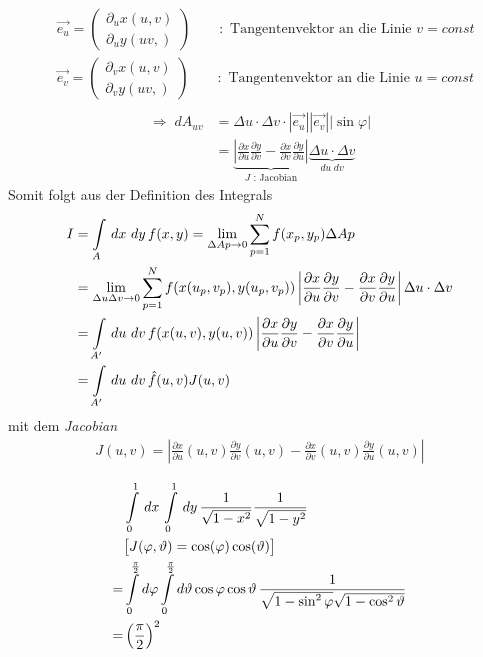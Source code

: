 \begin{align*}
&\vec{e_u} = \begin{pmatrix}\partial_u x(u,v)\\\partial_uy(uv,)\end{pmatrix} \qquad : \text{ Tangentenvektor an die Linie } v=const\\
&\vec{e_v} = \begin{pmatrix}\partial_v x(u,v)\\\partial_vy(uv,)\end{pmatrix} \qquad : \text{ Tangentenvektor an die Linie } u=const\\
\end{align*}
\begin{align*}
\Rightarrow\; dA_{uv} &= \Delta u \cdot \Delta v \cdot
|\vec{e_u}||\vec{e_v}||\sin{\varphi}|\\ 
&= \underbrace{\left|\frac{\partial x}{\partial u}\frac{\partial y}{\partial v}
- \frac{\partial x}{\partial v}\frac{\partial y}{\partial u}\right|}_{J
\text{ : Jacobian}}
\underbrace{\Delta u \cdot \Delta v}_{du\;dv}
\end{align*}
Somit folgt aus der Definition des Integrals
\begin{align}
I &= \int \limits_{A} \,dx\, \,dy\, f(x,y) = \lim \limits_{\Delta Ap\to 0} \sum \limits_{p=1}^{N} f(x_p,y_p)\Delta Ap\\ \nonumber
&= \lim \limits_{\Delta u\Delta v\to 0} \sum \limits_{p=1}^{N} f(x(u_p,v_p),
y(u_p,v_p))\left|\frac{\partial x}{\partial u}\frac{\partial
y}{\partial v}-\frac{\partial x}{\partial v}\frac{\partial y}{\partial
u}\right|\Delta u \cdot \Delta v\\ \nonumber &= \int \limits_{A'}\,du\, \,dv\,
f(x(u,v),y(u,v))\left|\frac{\partial x}{\partial u}\frac{\partial
y}{\partial v}-\frac{\partial x}{\partial v}\frac{\partial y}{\partial
u}\right|\\ \nonumber &=\int \limits_{A'} \,du\,\,dv\, \hat{f}(u,v)J(u,v)
\end{align}
mit dem {\em Jacobian}
\begin{align}
J(u,v) = \left|\frac{\partial x}{\partial u}(u,v)\frac{\partial y}{\partial
v}(u,v) - \frac{\partial x}{\partial v}(u,v)\frac{\partial y}{\partial
u}(u,v)\right|
\end{align}

\begin{Beispiel}
\begin{align*}
&\int\limits_{0}^{1}\,dx\,\int\limits_{0}^{1}\,dy\, \frac{1}{\sqrt{1-x^2}}\frac{1}{\sqrt{1-y^2}}\\
&\big[ J(\varphi,\vartheta) = \cos(\varphi)\cos(\vartheta) \big]\\
= & \int\limits_{0}^{\frac{\pi}{2}} d\varphi \int\limits_{0}^{\frac{\pi}{2}}
d\vartheta \cos{\varphi}\cos{\vartheta}\,
\frac{1}{\sqrt{1-\sin^2{\varphi}}\sqrt{1-\cos^2{\vartheta}}}\\ = & \left( \frac{\pi}{2} \right)^2
\end{align*}
\end{Beispiel}

